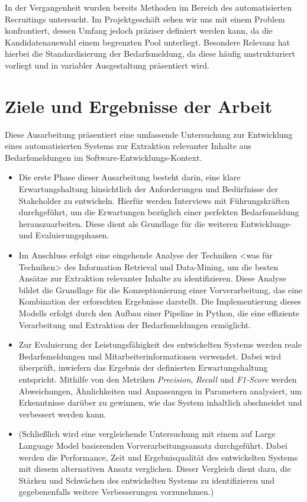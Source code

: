 \documentclass[a4paper,12pt]{scrreprt}
\newcommand{\hiddenchapter}[1]{
	\chapter*{{#1}}
}
\begin{document}
In der Vergangenheit wurden bereits Methoden im Bereich des automatisierten Recruitings untersucht. Im Projektgeschäft sehen wir uns mit einem Problem konfrontiert, dessen Umfang jedoch präziser definiert werden kann, da die Kandidatenauswahl einem begrenzten Pool unterliegt. Besondere Relevanz hat hierbei die Standardisierung der Bedarfsmeldung, da diese häufig unstrukturiert vorliegt und in variabler Ausgestaltung präsentiert wird.
\hiddenchapter{Ziele und Ergebnisse der Arbeit}
Diese Ausarbeitung präsentiert eine umfassende Untersuchung zur Entwicklung eines automatisierten Systems zur Extraktion relevanter Inhalte aus Bedarfsmeldungen im Software-Entwicklungs-Kontext.
\begin{itemize}
	\item Die erste Phase dieser Ausarbeitung besteht darin, eine klare Erwartungshaltung hinsichtlich der Anforderungen und Bedürfnisse der Stakeholder zu entwickeln. Hierfür werden Interviews mit Führungskräften durchgeführt, um die Erwartungen bezüglich einer \glqq{}perfekten\grqq{} Bedarfsmeldung herauszuarbeiten. Diese dient als Grundlage für die weiteren Entwicklungs- und Evaluierungsphasen.
	\item Im Anschluss erfolgt eine eingehende Analyse der Techniken <was für Techniken> des Information Retrieval und Data-Mining, um die besten Ansätze zur Extraktion relevanter Inhalte zu identifizieren. Diese Analyse bildet die Grundlage für die Konzeptionierung einer Vorverarbeitung, das eine Kombination der erforschten Ergebnisse darstellt. Die Implementierung dieses Modells erfolgt durch den Aufbau einer Pipeline in Python, die eine effiziente Verarbeitung und Extraktion der Bedarfsmeldungen ermöglicht.
	\item Zur Evaluierung der Leistungsfähigkeit des entwickelten Systems werden reale Bedarfsmeldungen und Mitarbeiterinformationen verwendet. Dabei wird überprüft, inwiefern das Ergebnis der definierten Erwartungshaltung entspricht. Mithilfe von den Metriken \emph{Precision}, \emph{Recall} und \emph{F1-Score} werden Abweichungen, Ähnlichkeiten und Anpassungen in Parametern analysiert, um Erkenntnisse darüber zu gewinnen, wie das System inhaltlich abschneidet und verbessert werden kann.
	\item (Schließlich wird eine vergleichende Untersuchung mit einem auf Large Language Model basierenden Vorverarbeitungsansatz durchgeführt. Dabei werden die Performance, Zeit und Ergebnisqualität des entwickelten Systems mit diesem alternativen Ansatz verglichen. Dieser Vergleich dient dazu, die Stärken und Schwächen des entwickelten Systems zu identifizieren und gegebenenfalls weitere Verbesserungen vorzunehmen.)
\end{itemize}
\end{document}
